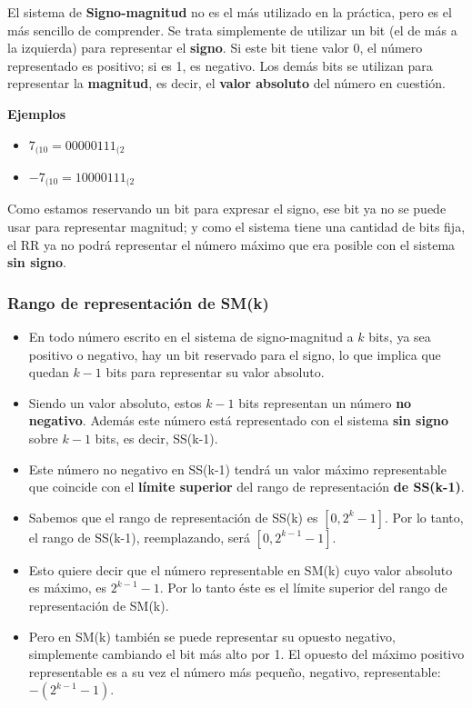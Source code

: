 \documentclass[spanish,A4,]{article}
\begin{document}
El sistema de \textbf{Signo-magnitud} no es el más utilizado en la
práctica, pero es el más sencillo de comprender. Se trata simplemente de
utilizar un bit (el de más a la izquierda) para representar el
\textbf{signo}. Si este bit tiene valor 0, el número representado es
positivo; si es 1, es negativo. Los demás bits se utilizan para
representar la \textbf{magnitud}, es decir, el \textbf{valor absoluto}
del número en cuestión.

\textbf{Ejemplos}

\begin{itemize}
\itemsep1pt\parskip0pt
\item
  $7_{(10} = 00000111_{(2}$
\item
  $-7_{(10} = 10000111_{(2}$
\end{itemize}

Como estamos reservando un bit para expresar el signo, ese bit ya no se
puede usar para representar magnitud; y como el sistema tiene una
cantidad de bits fija, el RR ya no podrá representar el número máximo
que era posible con el sistema \textbf{sin signo}.

\subsubsection{Rango de representación de
SM(k)}\label{rango-de-representaciuxf3n-de-smk}

\begin{itemize}
\itemsep1pt\parskip0pt
\item
  En todo número escrito en el sistema de signo-magnitud a $k$ bits, ya
  sea positivo o negativo, hay un bit reservado para el signo, lo que
  implica que quedan $k-1$ bits para representar su valor absoluto.
\item
  Siendo un valor absoluto, estos $k-1$ bits representan un número
  \textbf{no negativo}. Además este número está representado con el
  sistema \textbf{sin signo} sobre $k-1$ bits, es decir, SS(k-1).
\item
  Este número no negativo en SS(k-1) tendrá un valor máximo
  representable que coincide con el \textbf{límite superior} del rango
  de representación \textbf{de SS(k-1)}.
\item
  Sabemos que el rango de representación de SS(k) es $[0, 2^k-1]$. Por
  lo tanto, el rango de SS(k-1), reemplazando, será $[0, 2^{k-1} -1]$.
\item
  Esto quiere decir que el número representable en SM(k) cuyo valor
  absoluto es máximo, es $2^{k-1}-1$. Por lo tanto éste es el límite
  superior del rango de representación de SM(k).
\item
  Pero en SM(k) también se puede representar su opuesto negativo,
  simplemente cambiando el bit más alto por 1. El opuesto del máximo
  positivo representable es a su vez el número más pequeño, negativo,
  representable: $-(2^{k-1}-1)$.
\end{itemize}
\end{document}
